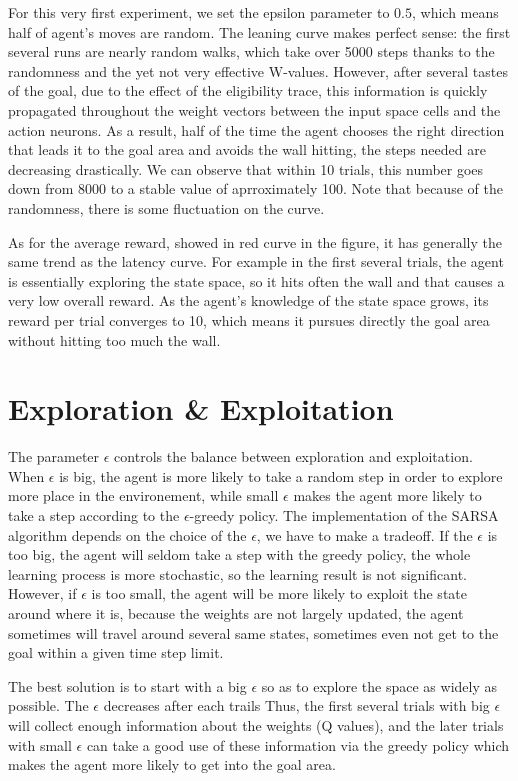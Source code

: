 \documentclass[a4paper, 11pt]{article}
\begin{document}
For this very first experiment, we set the epsilon parameter to $0.5$,
which means half of agent's moves are random. The leaning curve makes
perfect sense: the first several runs are nearly random walks, which
take over 5000 steps thanks to the randomness and the yet not very
effective W-values. However, after several tastes of the goal, due to
the effect of the eligibility trace, this information is quickly
propagated throughout the weight vectors between the input space cells
and the action neurons. As a result, half of the time the agent
chooses the right direction that leads it to the goal area and avoids
the wall hitting, the steps needed are decreasing drastically. We can
observe that within 10 trials, this number goes down from 8000 to
a stable value of aprroximately 100. Note that because of the
randomness, there is some fluctuation on the curve.

As for the average reward, showed in red curve in the figure, it has
generally the same trend as the latency curve. For example in the
first several trials, the agent is essentially exploring the state
space, so it hits often the wall and that causes a very low overall
reward. As the agent's knowledge of the state space grows, its reward
per trial converges to 10, which means it pursues directly the goal
area without hitting too much the wall.

\section{Exploration \& Exploitation}
The parameter $\epsilon$ controls the balance between exploration and exploitation. When $\epsilon$ is big, the agent is more likely to take a random step in order to explore more place in the environement, while small $\epsilon$ makes the agent more likely to take a step according to the $\epsilon$-greedy policy. The implementation of the SARSA algorithm depends on the choice of the $\epsilon$, we have to make a tradeoff. If the $\epsilon$ is too big, the agent will seldom take a step with the greedy policy, the whole learning process is more stochastic, so the learning result is not significant. However, if $\epsilon$ is too small, the agent will be more likely to exploit the state around where it is, because the weights are not largely updated, the agent sometimes will travel around several same states, sometimes even not get to the goal within a given time step limit.

The best solution is to start with a big $\epsilon$ so as to explore the space as widely as possible. The $\epsilon$ decreases after each trails Thus, the first several trials with big $\epsilon$ will collect enough information about the weights (Q values), and the later trials with small $\epsilon$ can take a good use of these information via the greedy policy which makes the agent more likely to get into the goal area.
\end{document}
